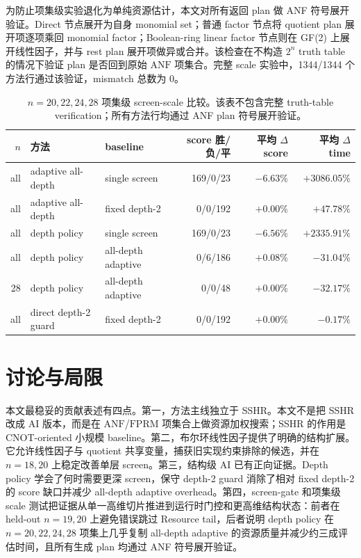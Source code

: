 \documentclass[UTF8,fontset=macnew,11pt]{ctexart}
\newcommand{\anf}{\ensuremath{\mathrm{ANF}}}
\newcommand{\fprm}{\ensuremath{\mathrm{FPRM}}}
\begin{document}
为防止项集级实验退化为单纯资源估计，本文对所有返回 plan 做 ANF 符号展开验证。Direct 节点展开为自身 monomial set；普通 factor 节点将 quotient plan 展开项逐项乘回 monomial factor；Boolean-ring linear factor 节点则在 GF(2) 上展开线性因子，并与 rest plan 展开项做异或合并。该检查在不构造 $2^n$ truth table 的情况下验证 plan 是否回到原始 \anf{} 项集合。完整 scale 实验中，1344/1344 个方法行通过该验证，mismatch 总数为 0。

\begin{table}[t]
\centering
\scriptsize
\caption{$n=20,22,24,28$ 项集级 screen-scale 比较。该表不包含完整 truth-table verification；所有方法行均通过 ANF plan 符号展开验证。}
\label{tab:scale}
\begin{tabular}{rllrrr}
\toprule
$n$ & 方法 & baseline & score 胜/负/平 & 平均 $\Delta$ score & 平均 $\Delta$ time \\
\midrule
all & adaptive all-depth & single screen & 169/0/23 & $-6.63\%$ & $+3086.05\%$ \\
all & adaptive all-depth & fixed depth-2 & 0/0/192 & $+0.00\%$ & $+47.78\%$ \\
all & depth policy & single screen & 169/0/23 & $-6.56\%$ & $+2335.91\%$ \\
all & depth policy & all-depth adaptive & 0/6/186 & $+0.08\%$ & $-31.04\%$ \\
28 & depth policy & all-depth adaptive & 0/0/48 & $+0.00\%$ & $-32.17\%$ \\
all & direct depth-2 guard & fixed depth-2 & 0/0/192 & $+0.00\%$ & $-0.17\%$ \\
\bottomrule
\end{tabular}
\end{table}

\section{讨论与局限}

本文最稳妥的贡献表述有四点。第一，方法主线独立于 SSHR。本文不是把 SSHR 改成 AI 版本，而是在 \anf{}/\fprm{} 项集合上做资源加权搜索；SSHR 的作用是 CNOT-oriented 小规模 baseline。第二，布尔环线性因子提供了明确的结构扩展。它允许线性因子与 quotient 共享变量，捕获旧实现约束排除的候选，并在 $n=18,20$ 上稳定改善单层 screen。第三，结构级 AI 已有正向证据。Depth policy 学会了何时需要更深 screen，保守 depth-2 guard 消除了相对 fixed depth-2 的 score 缺口并减少 all-depth adaptive overhead。第四，screen-gate 和项集级 scale 测试把证据从单一高维切片推进到运行时门控和更高维结构状态：前者在 held-out $n=19,20$ 上避免错误跳过 Resource tail，后者说明 depth policy 在 $n=20,22,24,28$ 项集上几乎复制 all-depth adaptive 的资源质量并减少约三成评估时间，且所有生成 plan 均通过 ANF 符号展开验证。
\end{document}
